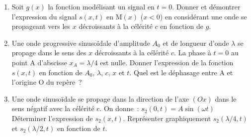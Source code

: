 \documentclass[a4paper, 12pt, final, garamond]{book}
\begin{document}
\begin{enumerate}[resume]
\begin{enumerate}
		      \item Soit $g(x)$ la fonction modélisant un signal en $t=0$. Donner
		            et démontrer l'expression du signal $s (x,t)$ en M$(x)$ ($x<0$) en
		            considérant une onde se propageant vers les $x$ décroissants à la
		            célérité $c$ en fonction de $g$.

		      \item Une onde progressive sinusoïdale d'amplitude $A_0$ et de
		            longueur d'onde $\lambda$ se propage dans le sens des $x$
		            décroissants à la célérité $c$. La phase à $t=0$ au point A
		            d'abscisse $x_A = {\lambda}/{4}$ est nulle. Donner l'expression
		            de la fonction $s(x,t)$ en fonction de $A_0$, $\lambda$, $c$,
		            $x$ et $t$. Quel est le déphasage entre A et l'origine O du
		            repère~?

		      \item Une onde sinusoïdale se propage dans la direction de l'axe
		            $(Ox)$ dans le sens négatif avec la célérité $c$. On donne~:
		            \hfill
		            $\boxed{s_2(0,t) = A \sin(\omega t)}$
		            \hfill~
		            \smallbreak
		            Déterminer l'expression de $s_2(x,t)$. Représenter graphiquement
		            $s_2(\lambda/4,t)$ et $s_2(\lambda/2,t)$ en fonction de $t$.
	      \end{enumerate}
\end{enumerate}
\end{document}
